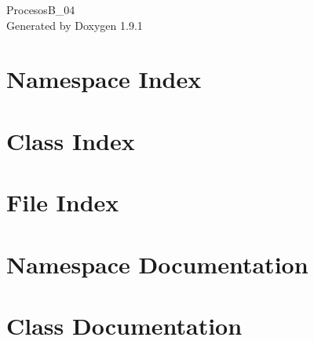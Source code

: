 \let\mypdfximage\pdfximage\def\pdfximage{\immediate\mypdfximage}\documentclass[twoside]{book}
\newcommand{\+}{\discretionary{\mbox{\scriptsize$\hookleftarrow$}}{}{}}
\newcommand{\clearemptydoublepage}{%
  \newpage{\pagestyle{empty}\cleardoublepage}%
}
\begin{document}
\raggedbottom

\hypersetup{pageanchor=false,
             bookmarksnumbered=true,
             pdfencoding=unicode
            }
\begin{titlepage}
\vspace*{7cm}
\begin{center}%
{\Large Procesos\+B\+\_\+04 }\\
\vspace*{1cm}
{\large Generated by Doxygen 1.9.1}\\
\end{center}
\end{titlepage}
\clearemptydoublepage
{}
\tableofcontents
\clearemptydoublepage
{}
\hypersetup{pageanchor=true}

\chapter{Namespace Index}

\chapter{Class Index}

\chapter{File Index}

\chapter{Namespace Documentation}

\chapter{Class Documentation}




















\end{document}

